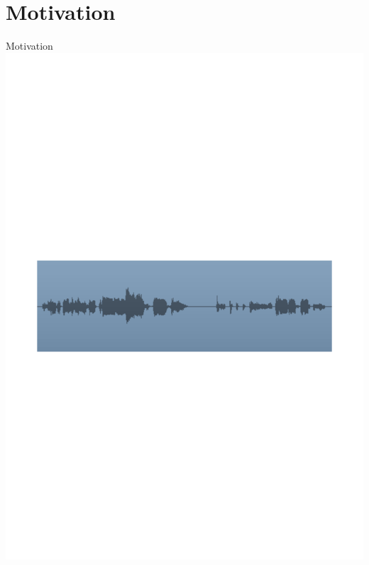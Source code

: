 \section{Motivation}



\begin{frame}[c]{Motivation}{}
	\includegraphics[scale=0.6]{images/wave}
	\centering
\end{frame}

